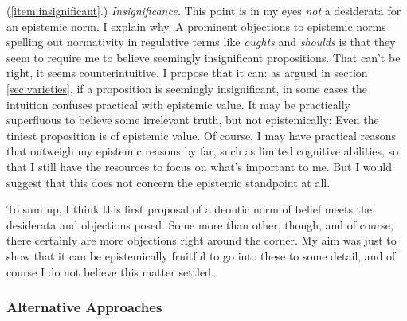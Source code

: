\documentclass[12pt,numbers=noenddot]{scrartcl}
\begin{document}
(\ref{item:insignificant}.) \emph{Insignificance.}
This point is in my eyes \emph{not} a desiderata for an epistemic norm. I explain why. A prominent objections to epistemic norms spelling out normativity in regulative terms like \emph{oughts} and \emph{shoulds} is that they seem to require me to believe seemingly insignificant propositions. That can't be right, it seems counterintuitive. I propose that it can: as argued in section \ref{sec:varieties}, if a proposition is seemingly insignificant, in some cases the intuition confuses practical with epistemic value. It may be practically superfluous to believe some irrelevant truth, but not epistemically: Even the tiniest proposition is of epistemic value. Of course, I may have practical reasons that outweigh my epistemic reasons by far, such as limited cognitive abilities, so that I still have the resources to focus on what's important to me. But I would suggest that this does not concern the epistemic standpoint at all.

To sum up, I think this first proposal of a deontic norm of belief meets the desiderata and objections posed. Some more than other, though, and of course, there certainly are more objections right around the corner. My aim was just to show that it can be epistemically fruitful to go into these to some detail, and of course I do not believe this matter settled.

\subsubsection{Alternative Approaches}
\end{document}
